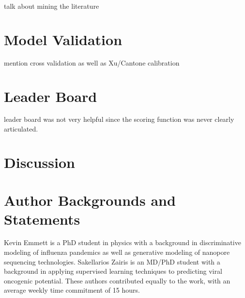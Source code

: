 \documentclass[letterpaper, 11pt]{article}
\begin{document}
talk about mining the literature

\section{Model Validation}

mention cross validation as well as Xu/Cantone calibration

\section{Leader Board}

leader board was not very helpful since the scoring function was never clearly articulated.

\section{Discussion}


\section{Author Backgrounds and Statements}

Kevin Emmett is a PhD student in physics with a background in discriminative modeling of influenza pandemics as well as generative modeling of nanopore sequencing technologies.  Sakellarios Zairis is an MD/PhD student with a background in applying supervised learning techniques to predicting viral oncogenic potential.  These authors contributed equally to the work, with an average weekly time commitment of 15 hours.


\end{document}
